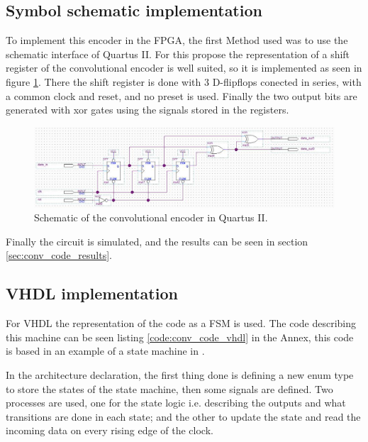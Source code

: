 \documentclass[12pt]{article}   	%
\begin{document}
\subsection{Symbol schematic implementation}

To implement this encoder in the FPGA, the first Method used was to use the schematic interface of Quartus II. For this propose the representation of a shift register of the convolutional encoder is well suited, so it is implemented as seen in figure \ref{fig:conv_code_sch}. There the shift register is done with 3 D-flipflops conected in series, with a common clock and reset, and no preset is used. Finally the two output bits are generated with xor gates using the signals stored in the registers.

\begin{figure}[htbp]
\begin{center}
\includegraphics[width=\textwidth]{img/convolutional_code_sr.png}
\caption{Schematic of the convolutional encoder in Quartus II.}
\label{fig:conv_code_sch}
\end{center}
\end{figure}


Finally the circuit is simulated, and the results can be seen in section \ref{sec:conv_code_results}.


\subsection{VHDL implementation}
For VHDL the representation of the code as a FSM is used. The code describing this machine can be seen listing \ref{code:conv_code_vhdl} in the Annex, this code is based in an example of a state machine in \cite{vhdl_douglas}.

In the architecture declaration, the first thing done is defining a new enum type to store the states of the state machine, then some signals are defined. Two processes are used, one for the state logic i.e. describing the outputs and what transitions are done in each state; and the other to update the state and read the incoming data on every rising edge of the clock.
\end{document}

